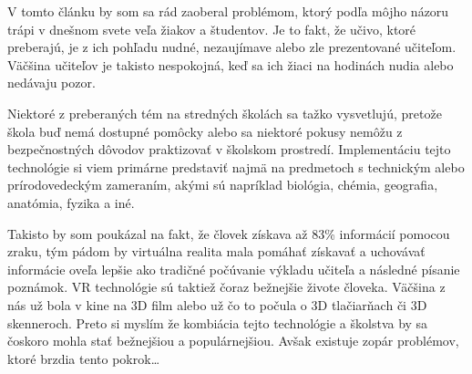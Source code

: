 \qquad V tomto článku by som sa rád zaoberal problémom, ktorý podľa môjho názoru trápi
v dnešnom svete veľa žiakov a študentov. Je to fakt, že učivo, ktoré preberajú, je z ich pohľadu
nudné, nezaujímave alebo zle prezentované učiteľom. Väčšina učiteľov je takisto
nespokojná, keď sa ich žiaci na hodinách nudia alebo nedávaju pozor.
\par Niektoré z
preberaných tém na stredných školách sa tažko vysvetlujú, pretože škola buď nemá 
dostupné pomôcky alebo sa niektoré pokusy nemôžu z bezpečnostných dôvodov praktizovať 
v školskom prostredí. Implementáciu tejto technológie si viem primárne predstaviť 
najmä na predmetoch s technickým alebo prírodovedeckým zameraním,  
akými sú napríklad biológia, chémia, geografia, anatómia, fyzika a iné.
\par Takisto by som poukázal na fakt, že človek získava až 83\% informácií pomocou zraku\citep{Zdroj1}, 
tým pádom by virtuálna realita mala pomáhať získavať a uchovávať informácie oveľa lepšie ako tradičné
počúvanie výkladu učiteľa a následné písanie poznámok. VR technológie sú taktiež čoraz bežnejšie živote človeka.
Väčšina z nás už bola v kine na 3D film alebo už čo to počula o 3D tlačiarňach či 3D skenneroch\citep{Zdroj2}.
Preto si myslím že kombiácia tejto technológie a školstva by sa čoskoro mohla stať bežnejšiou a populárnejšiou.
Avšak existuje zopár problémov, ktoré brzdia tento pokrok\ldots